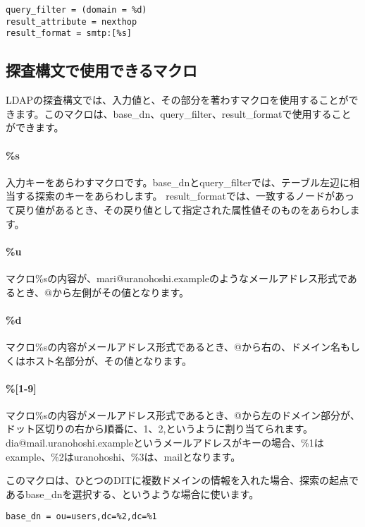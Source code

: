 \begin{verbatim}
query_filter = (domain = %d)
result_attribute = nexthop
result_format = smtp:[%s]
\end{verbatim}

\subsection{探査構文で使用できるマクロ}

LDAPの探査構文では、入力値と、その部分を著わすマクロを使用することができます。このマクロは、base\_dn、query\_filter、result\_formatで使用することができます。

\paragraph{\%s}
入力キーをあらわすマクロです。base\_dnとquery\_filterでは、テーブル左辺に相当する探索のキーをあらわします。
result\_formatでは、一致するノードがあって戻り値があるとき、その戻り値として指定された属性値そのものをあらわします。

\paragraph{\%u}
マクロ\%sの内容が、mari@uranohoshi.exampleのようなメールアドレス形式であるとき、@から左側がその値となります。

\paragraph{\%d}
マクロ\%sの内容がメールアドレス形式であるとき、@から右の、ドメイン名もしくはホスト名部分が、その値となります。

\paragraph{\%[1-9]}
マクロ\%sの内容がメールアドレス形式であるとき、@から左のドメイン部分が、ドット区切りの右から順番に、1、2,というように割り当てられます。dia@mail.uranohoshi.exampleというメールアドレスがキーの場合、\%1はexample、\%2はuranohoshi、\%3は、mailとなります。

このマクロは、ひとつのDITに複数ドメインの情報を入れた場合、探索の起点であるbase\_dnを選択する、というような場合に使います。

\begin{verbatim}
base_dn = ou=users,dc=%2,dc=%1
\end{verbatim}